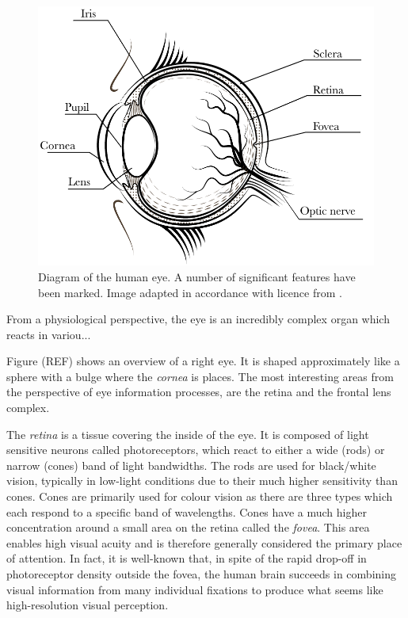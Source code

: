 \begin{figure}
    \centering
    \includegraphics[width=0.8\linewidth]{figures/eye.pdf}
    \caption{Diagram of the human eye. A number of significant features have been marked. Image adapted in accordance with licence from \cite{freepik}.}
    \label{fig:my_label}
\end{figure}

From a physiological perspective, the eye is an incredibly complex organ which reacts in variou...


Figure (REF) shows an overview of a right eye. It is shaped approximately like a sphere with a bulge where the \emph{cornea} is places. The most interesting areas from the perspective of eye information processes, are the retina and the frontal lens complex. 

The \emph{retina} is a tissue covering the inside of the eye. It is composed of light sensitive neurons called photoreceptors, which react to either a wide (rods) or narrow (cones) band of light bandwidths. The rods are used for black/white vision, typically in low-light conditions due to their much higher sensitivity than cones. Cones are primarily used for colour vision as there are three types which each respond to a specific band of wavelengths. Cones have a much higher concentration around a small area on the retina called the \emph{fovea}. This area enables high visual acuity and is therefore generally considered the primary place of attention. In fact, it is well-known that, in spite of the rapid drop-off in photoreceptor density outside the fovea, the human brain succeeds in combining visual information from many individual fixations to produce what seems like high-resolution visual perception.

